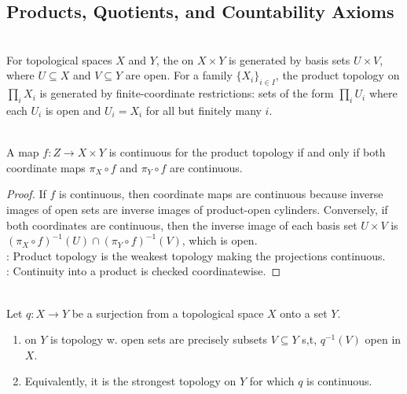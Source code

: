 \subsection{Products, Quotients, and Countability Axioms}

\begin{definition} \label{def:product-topology} \\
For topological spaces $X$ and $Y$, the  on $X\times Y$ is generated by basis sets $U\times V$, where $U\subseteq X$ and $V\subseteq Y$ are open. For a family $\{X_i\}_{i\in I}$, the product topology on $\prod_iX_i$ is generated by finite-coordinate restrictions: sets of the form $\prod_iU_i$ where each $U_i$ is open and $U_i=X_i$ for all but finitely many $i$.
\end{definition}

\begin{proposition} \label{prop:product-topology-coordinate-continuity} \\
A map $f:Z\to X\times Y$ is continuous for the product topology if and only if both coordinate maps $\pi_X\circ f$ and $\pi_Y\circ f$ are continuous.
\begin{proof}
If $f$ is continuous, then coordinate maps are continuous because inverse images of open sets are inverse images of product-open cylinders. Conversely, if both coordinates are continuous, then the inverse image of each basis set $U\times V$ is $(\pi_X\circ f)^{-1}(U)\cap(\pi_Y\circ f)^{-1}(V)$, which is open.\\
: Product topology is the weakest topology making the projections continuous.\\
: Continuity into a product is checked coordinatewise.
\end{proof}
\end{proposition}

\begin{definition} \label{def:quotient-topology} \\
Let $q:X\to Y$ be a surjection from a topological space $X$ onto a set $Y$.
\begin{enumerate}[label=(\roman*)]
\setlength{\itemsep}{0pt}
\item {} on $Y$ is topology w. open sets are precisely subsets $V\subseteq Y$ s,t, $q^{-1}(V)$ open in $X$.
\item Equivalently, it is the strongest topology on $Y$ for which $q$ is continuous.
\end{enumerate}
\end{definition}

